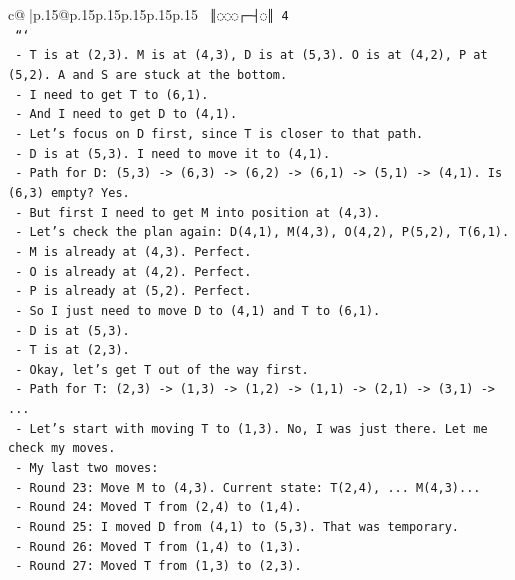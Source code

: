\documentclass{article}
\begin{document}
{\begin{supertabular}{c@{$\;$}|p{.15\linewidth}@{}p{.15\linewidth}p{.15\linewidth}p{.15\linewidth}p{.15\linewidth}p{.15\linewidth}}
{{{\texttt{   ║◌◌◌┌─┤◌║ 4} \\
\texttt{   ```} \\
\texttt{   {-} T is at (2,3). M is at (4,3), D is at (5,3). O is at (4,2), P at (5,2). A and S are stuck at the bottom.} \\
\texttt{   {-} I need to get T to (6,1).} \\
\texttt{   {-} And I need to get D to (4,1).} \\
\texttt{   {-} Let's focus on D first, since T is closer to that path.} \\
\texttt{   {-} D is at (5,3). I need to move it to (4,1).} \\
\texttt{   {-} Path for D: (5,3) {-}> (6,3) {-}> (6,2) {-}> (6,1) {-}> (5,1) {-}> (4,1). Is (6,3) empty? Yes.} \\
\texttt{   {-} But first I need to get M into position at (4,3).} \\
\texttt{   {-} Let's check the plan again: D(4,1), M(4,3), O(4,2), P(5,2), T(6,1).} \\
\texttt{   {-} M is already at (4,3). Perfect.} \\
\texttt{   {-} O is already at (4,2). Perfect.} \\
\texttt{   {-} P is already at (5,2). Perfect.} \\
\texttt{   {-} So I just need to move D to (4,1) and T to (6,1).} \\
\texttt{   {-} D is at (5,3).} \\
\texttt{   {-} T is at (2,3).} \\
\texttt{   {-} Okay, let's get T out of the way first.} \\
\texttt{   {-} Path for T: (2,3) {-}> (1,3) {-}> (1,2) {-}> (1,1) {-}> (2,1) {-}> (3,1) {-}> ...} \\
\texttt{   {-} Let's start with moving T to (1,3). No, I was just there. Let me check my moves.} \\
\texttt{   {-} My last two moves:} \\
\texttt{     {-} Round 23: Move M to (4,3). Current state: T(2,4), ... M(4,3)...} \\
\texttt{     {-} Round 24: Moved T from (2,4) to (1,4).} \\
\texttt{     {-} Round 25: I moved D from (4,1) to (5,3). That was temporary.} \\
\texttt{     {-} Round 26: Moved T from (1,4) to (1,3).} \\
\texttt{     {-} Round 27: Moved T from (1,3) to (2,3).} \\
}}}
\end{supertabular}}
\end{document}
